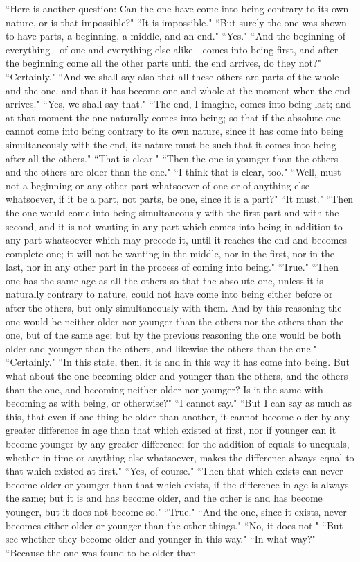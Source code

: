 \documentclass[letterpaper,12pt]{article}
\newcommand{\stephpag}[1]{\marginnote{\small\itshape\fontfamily{ppl}\selectfont #1}}
\begin{document}
``Here is another question: Can the one have come into being contrary to its own nature, or is that impossible?" ``It is impossible." \stephpag{c} ``But surely the one was shown to have parts, a beginning, a middle, and an end." ``Yes." ``And the beginning of everything—of one and everything else alike—comes into being first, and after the beginning come all the other parts until the end arrives, do they not?" ``Certainly." ``And we shall say also that all these others are parts of the whole and the one, and that it has become one and whole at the moment when the end arrives." ``Yes, we shall say that." ``The end, I imagine, comes into being last; and at that moment the one naturally comes into being; \stephpag{d} so that if the absolute one cannot come into being contrary to its own nature, since it has come into being simultaneously with the end, its nature must be such that it comes into being after all the others." ``That is clear." ``Then the one is younger than the others and the others are older than the one." ``I think that is clear, too." ``Well, must not a beginning or any other part whatsoever of one or of anything else whatsoever, if it be a part, not parts, be one, since it is a part?" ``It must." \stephpag{e} ``Then the one would come into being simultaneously with the first part and with the second, and it is not wanting in any part which comes into being in addition to any part whatsoever which may precede it, until it reaches the end and becomes complete one; it will not be wanting in the middle, nor in the first, nor in the last, nor in any other part in the process of coming into being." ``True." ``Then one has the same age as all the others so that the absolute one, unless it is naturally contrary to nature, could not have come into being either before or after the others, but only simultaneously with them. \stephpag{154 a} And by this reasoning the one would be neither older nor younger than the others nor the others than the one, but of the same age; but by the previous reasoning the one would be both older and younger than the others, and likewise the others than the one." ``Certainly." ``In this state, then, it is and in this way it has come into being. But what about the one becoming older and younger than the others, and the others than the one, and becoming neither older nor younger? Is it the same with becoming as with being, or otherwise?" \stephpag{b} ``I cannot say." ``But I can say as much as this, that even if one thing be older than another, it cannot become older by any greater difference in age than that which existed at first, nor if younger can it become younger by any greater difference; for the addition of equals to unequals, whether in time or anything else whatsoever, makes the difference always equal to that which existed at first." ``Yes, of course." ``Then that which exists \stephpag{c} can never become older or younger than that which exists, if the difference in age is always the same; but it is and has become older, and the other is and has become younger, but it does not become so." ``True." ``And the one, since it exists, never becomes either older or younger than the other things." ``No, it does not." ``But see whether they become older and younger in this way." ``In what way?" ``Because the one was found to be older than 
\end{document}
